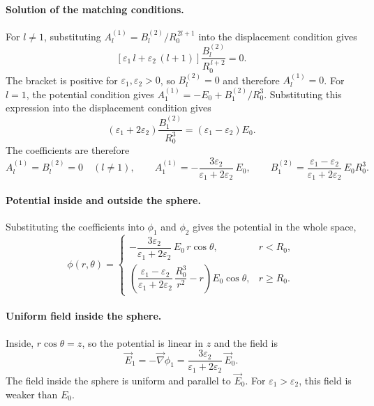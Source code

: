 \paragraph{Solution of the matching conditions.}
For $l \neq 1$, substituting $A_l^{(1)} = B_l^{(2)}/R_0^{\,2l+1}$ into the displacement condition gives
\begin{equation*}
    \left[\varepsilon_1\, l + \varepsilon_2\,(l+1)\right]\frac{B_l^{(2)}}{R_0^{\,l+2}} = 0.
\end{equation*}
The bracket is positive for $\varepsilon_1, \varepsilon_2 > 0$, so $B_l^{(2)} = 0$ and therefore $A_l^{(1)} = 0$. For $l = 1$, the potential condition gives $A_1^{(1)} = -E_0 + B_1^{(2)}/R_0^3$. Substituting this expression into the displacement condition gives
\begin{equation*}
    \left(\varepsilon_1 + 2\varepsilon_2\right)\frac{B_1^{(2)}}{R_0^3} = \left(\varepsilon_1 - \varepsilon_2\right)E_0.
\end{equation*}
The coefficients are therefore
\begin{equation}
    \boxed{
    A_l^{(1)} = B_l^{(2)} = 0 \quad (l \neq 1), \qquad
    A_1^{(1)} = -\frac{3\varepsilon_2}{\varepsilon_1 + 2\varepsilon_2}\,E_0, \qquad
    B_1^{(2)} = \frac{\varepsilon_1 - \varepsilon_2}{\varepsilon_1 + 2\varepsilon_2}\,E_0 R_0^3.
    }
\end{equation}

\paragraph{Potential inside and outside the sphere.}
Substituting the coefficients into $\phi_1$ and $\phi_2$ gives the potential in the whole space,
\begin{equation}
    \boxed{
    \phi(r,\theta) =
    \begin{cases}
        -\dfrac{3\varepsilon_2}{\varepsilon_1 + 2\varepsilon_2}\,E_0\,r\cos\theta, & r < R_0,\\[12pt]
        \left(\dfrac{\varepsilon_1 - \varepsilon_2}{\varepsilon_1 + 2\varepsilon_2}\,\dfrac{R_0^3}{r^2} - r\right)E_0\cos\theta, & r \geq R_0.
    \end{cases}
    }
\end{equation}

\paragraph{Uniform field inside the sphere.}
Inside, $r\cos\theta = z$, so the potential is linear in $z$ and the field is
\begin{equation}
    \boxed{
    \vec E_1 = -\vec\nabla\phi_1 = \frac{3\varepsilon_2}{\varepsilon_1 + 2\varepsilon_2}\,\vec E_0.
    }
\end{equation}
The field inside the sphere is uniform and parallel to $\vec E_0$. For $\varepsilon_1 > \varepsilon_2$, this field is weaker than $E_0$.

